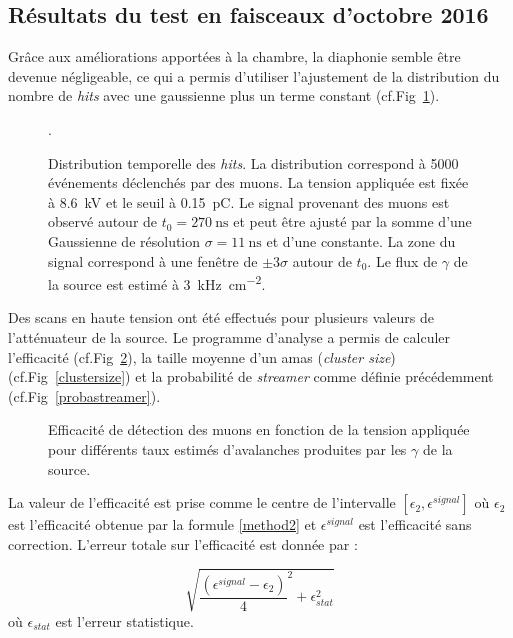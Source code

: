 \subsection{Résultats du test en faisceaux d'octobre 2016}
\label{GIFFF4}
Grâce aux améliorations apportées à la chambre, la diaphonie semble être devenue négligeable, ce qui a permis d'utiliser l'ajustement de la distribution du nombre de \textit{hits} avec une gaussienne plus un terme constant (cf.Fig~\ref{ajust}).
\begin{figure}[!ht]
	\centering
	\caption{Distribution temporelle des \textit{hits}. La distribution correspond à \num{5000} événements déclenchés par des muons. La tension appliquée est fixée à \SI{8.6}{\kilo\volt} et le seuil à \SI{0.15}{\pico\coulomb}. Le signal provenant des muons est observé autour de $t_0=\SI{270}{\nano\second}$ et peut être ajusté par la somme d'une Gaussienne de résolution $\sigma=\SI{11}{\nano\second}$ et d'une constante. La zone du signal correspond à une fenêtre de $\pm 3 \sigma$ autour de $t_0$. Le flux de $\gamma$ de la source est estimé à \SI{3}{\kilo\hertz\per\square\centi\meter}.}.
	\label{ajust}
\end{figure}

 Des scans en haute tension ont été effectués pour plusieurs valeurs de l'atténuateur de la source. Le programme d'analyse a permis de calculer l'efficacité (cf.Fig~\ref{effifi}), la taille moyenne d'un amas (\textit{cluster size}) (cf.Fig~\ref{clustersize}) et la probabilité de \textit{streamer} comme définie précédemment (cf.Fig~\ref{probastreamer}).

 \begin{figure}[!ht]
 	\centering
 	\caption{Efficacité de détection des muons en fonction de la tension appliquée pour différents taux estimés d'avalanches produites par les $\gamma$ de la source.}
 	\label{effifi}
 \end{figure}

\newpage
La valeur de l'efficacité est prise comme le centre de l'intervalle $\left[\epsilon_2,\epsilon^{signal}\right]$ où $\epsilon_2$ est l'efficacité obtenue par la formule \ref{method2} et $\epsilon^{signal}$ est l'efficacité sans correction. L'erreur totale sur l'efficacité est donnée par :

\begin{equation}
\sqrt{{\frac{\left(\epsilon^{signal}-\epsilon_2\right)}{4}}^2+\epsilon_{stat}^2}
\end{equation}
où $\epsilon_{stat}$ est l'erreur statistique.


